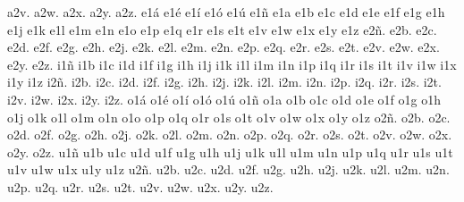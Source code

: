 a2v.
a2w.
a2x.
a2y.
a2z.
e1\'a
e1\'e
e1\'i
e1\'o
e1\'u
e1\~n
e1a
e1b
e1c
e1d
e1e
e1f
e1g
e1h
e1j
e1k
e1l
e1m
e1n
e1o
e1p
e1q
e1r
e1s
e1t
e1v
e1w
e1x
e1y
e1z
e2\~n.
e2b.
e2c.
e2d.
e2f.
e2g.
e2h.
e2j.
e2k.
e2l.
e2m.
e2n.
e2p.
e2q.
e2r.
e2s.
e2t.
e2v.
e2w.
e2x.
e2y.
e2z.
i1\~n
i1b
i1c
i1d
i1f
i1g
i1h
i1j
i1k
i1l
i1m
i1n
i1p
i1q
i1r
i1s
i1t
i1v
i1w
i1x
i1y
i1z
i2\~n.
i2b.
i2c.
i2d.
i2f.
i2g.
i2h.
i2j.
i2k.
i2l.
i2m.
i2n.
i2p.
i2q.
i2r.
i2s.
i2t.
i2v.
i2w.
i2x.
i2y.
i2z.
o1\'a
o1\'e
o1\'i
o1\'o
o1\'u
o1\~n
o1a
o1b
o1c
o1d
o1e
o1f
o1g
o1h
o1j
o1k
o1l
o1m
o1n
o1o
o1p
o1q
o1r
o1s
o1t
o1v
o1w
o1x
o1y
o1z
o2\~n.
o2b.
o2c.
o2d.
o2f.
o2g.
o2h.
o2j.
o2k.
o2l.
o2m.
o2n.
o2p.
o2q.
o2r.
o2s.
o2t.
o2v.
o2w.
o2x.
o2y.
o2z.
u1\~n
u1b
u1c
u1d
u1f
u1g
u1h
u1j
u1k
u1l
u1m
u1n
u1p
u1q
u1r
u1s
u1t
u1v
u1w
u1x
u1y
u1z
u2\~n.
u2b.
u2c.
u2d.
u2f.
u2g.
u2h.
u2j.
u2k.
u2l.
u2m.
u2n.
u2p.
u2q.
u2r.
u2s.
u2t.
u2v.
u2w.
u2x.
u2y.
u2z.
